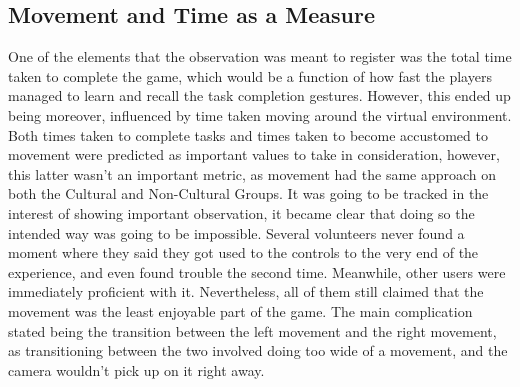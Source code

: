 \subsection{Movement and Time as a Measure } \label{sec:results_game_movementtime}
    One of the elements that the observation was meant to register was the total time taken to complete the game, which would be a function of how fast the players managed to learn and recall the task completion gestures. However, this ended up being moreover, influenced by time taken moving around the virtual environment.\\
    Both times taken to complete tasks and times taken to become accustomed to movement were predicted as important values to take in consideration, however, this latter wasn’t an important metric, as movement had the same approach on both the Cultural and Non-Cultural Groups. It was going to be tracked in the interest of showing important observation, it became clear that doing so the intended way was going to be impossible. Several volunteers never found a moment where they said they got used to the controls to the very end of the experience, and even found trouble the second time. Meanwhile, other users were immediately proficient with it. Nevertheless, all of them still claimed that the movement was the least enjoyable part of the game. The main complication stated being the transition between the left movement and the right movement, as transitioning between the two involved doing too wide of a movement, and the camera wouldn’t pick up on it right away.\\
